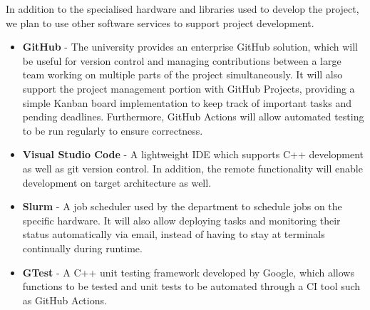 In addition to the specialised hardware and libraries used to develop the project, we plan to use other software services to support project development.
\begin{itemize}
    \item \textbf{GitHub} - The university provides an enterprise GitHub solution, which will be useful for version control and managing contributions between a large team working on multiple parts of the project simultaneously. It will also support the project management portion with GitHub Projects, providing a simple Kanban board implementation to keep track of important tasks and pending deadlines. Furthermore, GitHub Actions will allow automated testing to be run regularly to ensure correctness. 
    
    \item \textbf{Visual Studio Code} - A lightweight IDE which supports C++ development as well as git version control. In addition, the remote functionality will enable development on target architecture as well. 
   
    \item \textbf{Slurm} - A job scheduler used by the department to schedule jobs on the specific hardware. It will also allow deploying tasks and monitoring their status automatically via email, instead of having to stay at terminals continually during runtime. 

    \item \textbf{GTest} \cite{gtest} - A C++ unit testing framework developed by Google, which allows functions to be tested and unit tests to be automated through a CI tool such as GitHub Actions.

\end{itemize}